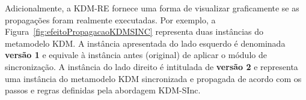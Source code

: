 Adicionalmente, a KDM-RE fornece uma forma de visualizar graficamente se as propagações foram realmente executadas. Por exemplo, a Figura~\ref{fig:efeitoPropagacaoKDMSINC} representa duas instâncias do metamodelo KDM. A instância apresentada do lado esquerdo é denominada \textbf{versão 1} e equivale à instância antes (original) de aplicar o módulo de sincronização. A instância do lado direito é intitulada de \textbf{versão 2} e representa uma instância do metamodelo KDM sincronizada e propagada de acordo com os passos e regras definidas pela abordagem KDM-SInc.%









